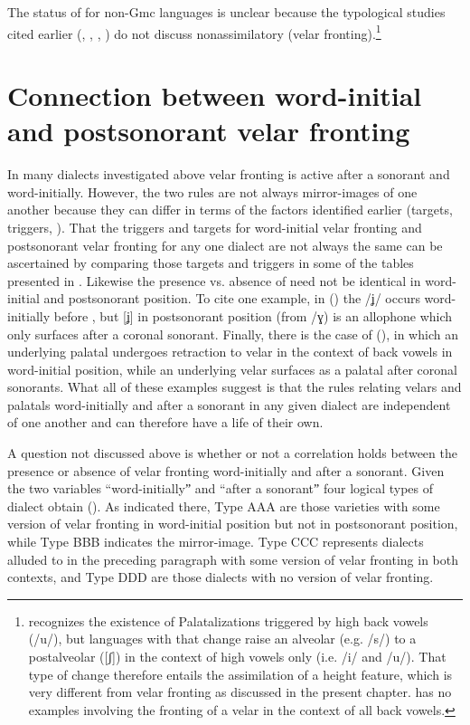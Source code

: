 The status of  for non-Gmc languages is unclear because the typological studies cited earlier (\citealt{Chen1973}, \citealt{Bhat1978}, \citealt{Bateman2007,Bateman2011,Bateman2007}, \citealt{Kochetov2011}) do not discuss nonassimilatory  (velar fronting).\footnote{{\citet[64]{Bateman2007} recognizes the existence of Palatalizations triggered by high back vowels (/u/), but languages with that change raise an alveolar (e.g. /s/) to a postalveolar ([ʃ]) in the context of high vowels only (i.e. /i/ and /u/). That type of change therefore entails the assimilation of a height feature, which is very different from velar fronting as discussed in the present chapter. \citet{Bateman2007} has no examples involving the fronting of a velar in the context of all back vowels.} }

\section{{Connection} {between} {word-initial} {and} {postsonorant} {velar} {fronting}}\label{sec:14.7}

In many dialects investigated above velar fronting is active after a sonorant and word-initially. However, the two rules are not always mirror-images of one another because they can differ in terms of the factors identified earlier (targets, triggers, ). That the triggers and targets for word-initial velar fronting and postsonorant velar fronting for any one dialect are not always the same can be ascertained by comparing those targets and triggers in some of the tables presented in . Likewise the presence vs. absence of  need not be identical in word-initial and postsonorant position. To cite one example, in  () the  /ʝ/ occurs word-initially before , but [ʝ] in postsonorant position (from /ɣ) is an allophone which only surfaces after a coronal sonorant. Finally, there is the case of  (), in which an underlying palatal undergoes retraction to velar in the context of back vowels in word-initial position, while an underlying velar surfaces as a palatal after coronal sonorants. What all of these examples suggest is that the rules relating velars and palatals word-initially and after a sonorant in any given dialect are independent of one another and can therefore have a life of their own.

A question not discussed above is whether or not a correlation holds between the presence or absence of velar fronting word-initially and after a sonorant. Given the two variables “word-initiallyˮ and “after a sonorantˮ four logical types of dialect obtain (). As indicated there, Type AAA are those varieties with some version of velar fronting in word-initial position but not in postsonorant position, while Type BBB indicates the mirror-image. Type CCC represents dialects alluded to in the preceding paragraph with some version of velar fronting in both contexts, and Type DDD are those dialects with no version of velar fronting.

